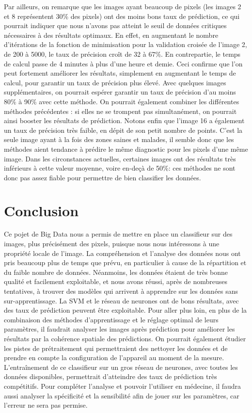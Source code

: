 \documentclass[a4paper,10pt]{report}
\begin{document}
Par ailleurs, on remarque que les images ayant beaucoup de pixels (les images 2 et 8 représentent 30\% des pixels) ont des moins bons taux de prédiction, ce qui pourrait indiquer que nous n'avons pas atteint le seuil de données critiques nécessaires à des résultats optimaux. En effet, en augmentant le nombre d’itérations de la fonction de minimisation pour la validation croisée de l’image 2, de 200 à 5000, le taux de précision croît de 32 à 67\%. En contrepartie, le temps de calcul passe de 4 minutes à plus d’une heure et demie. Ceci confirme que l’on peut fortement améliorer les résultats, simplement en augmentant le temps de calcul, pour garantir un taux de précision plus élevé.
Avec quelques images supplémentaires, on pourrait espérer garantir un taux de précision d'au moins 80\% à 90\% avec cette méthode. On pourrait également combiner les différentes méthodes précédentes : si elles ne se trompent pas simultanément, on pourrait ainsi booster les résultats de prédiction.
Notons enfin que l'image 16 a également un taux de précision très faible, en dépit de son petit nombre de points. C'est la seule image ayant à la fois des zones saines et malades, il semble donc que les méthodes aient tendance à prédire le même diagnostic pour les pixels d'une même image.
Dans les circonstances actuelles, certaines images ont des résultats très inférieurs à cette valeur moyenne, voire en-deçà de 50\%: ces méthodes ne sont donc pas assez fiable pour permettre de bien classifier les données.


\chapter*{Conclusion}
Ce pojet de Big Data nous a permis de mettre en place un classifieur sur des images, plus précisément des pixels, puisque nous nous intéressons à une propriété locale de l'image. La compréhension et l'analyse des données nous ont pris beaucoup plus de temps que prévu, en particulier à cause de la répartition et du faible nombre de données. Néanmoins, les données étaient de très bonne qualité et facilement exploitable, et nous avons réussi, après de nombreuses tentatives, à trouver des modèles qui arrivent à apprendre sur les données sans sur-apprentissage. La SVM et le réseau de neurones ont de bons résultats, avec des taux de prédiction peuvent être exploitable. Pour aller plus loin, en plus de la combinaison des méthodes d’apprentissage et le réglage optimal de leurs paramètres, il faudrait analyser les images après prédiction pour améliorer les résultats par la cohérence spatiale des prédictions. On pourrait également étudier les pistes de prétraitement qui permettraient des nettoyer les données et de prendre en compte la configuration de l'appareil au moment de la mesure. L’entraînement de ce classifieur sur un gros réseau de neurones, avec toutes les données disponibles, permettrait d'atteindre des taux de prédiction très compétitifs. Pour compléter l'analyse et pouvoir l'utiliser en médecine, il faudra aussi analyser la spécificité et la sensibilité afin de jouer sur les paramètres, car l’erreur ne sera pas permise.

\tableofcontents
\listoffigures
\end{document}
